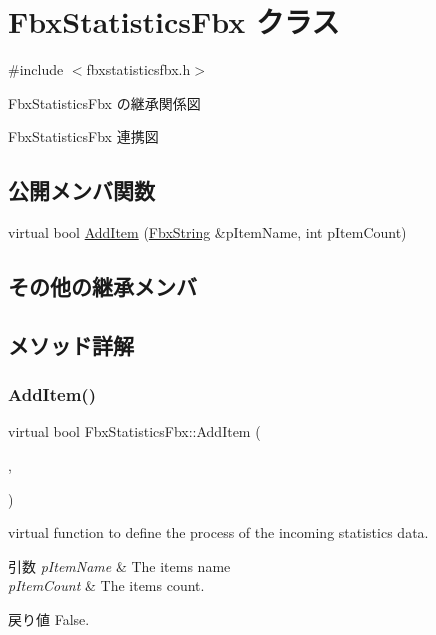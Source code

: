 \hypertarget{class_fbx_statistics_fbx}{}\section{Fbx\+Statistics\+Fbx クラス}
\label{class_fbx_statistics_fbx}


{\ttfamily \#include $<$fbxstatisticsfbx.\+h$>$}



Fbx\+Statistics\+Fbx の継承関係図


Fbx\+Statistics\+Fbx 連携図
\subsection*{公開メンバ関数}
\begin{DoxyCompactItemize}
\item 
virtual bool \hyperlink{class_fbx_statistics_fbx_a572bf7348dca4967ed1b43c7d2e32982}{Add\+Item} (\hyperlink{class_fbx_string}{Fbx\+String} \&p\+Item\+Name, int p\+Item\+Count)
\end{DoxyCompactItemize}
\subsection*{その他の継承メンバ}


\subsection{メソッド詳解}
\mbox{\label{class_fbx_statistics_fbx_a572bf7348dca4967ed1b43c7d2e32982}} 
\subsubsection{\texorpdfstring{Add\+Item()}{AddItem()}}
{\footnotesize\ttfamily virtual bool Fbx\+Statistics\+Fbx\+::\+Add\+Item (\begin{DoxyParamCaption}\item[{\hyperlink{class_fbx_string}{Fbx\+String} \&}]{,  }\item[{int}]{ }\end{DoxyParamCaption})\hspace{0.3cm}{\ttfamily [virtual]}}

virtual function to define the process of the incoming statistics data. 
\begin{DoxyParams}{引数}
{\em p\+Item\+Name} & The item\textquotesingle{}s name \\
\hline
{\em p\+Item\+Count} & The item\textquotesingle{}s count. \\
\hline
\end{DoxyParams}
\begin{DoxyReturn}{戻り値}
False. 
\end{DoxyReturn}


